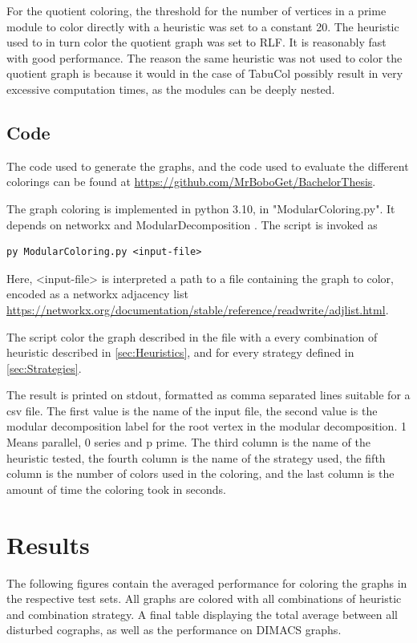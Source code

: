 \documentclass[a4paper]{article}
\begin{document}
For the quotient coloring, the threshold for the number of vertices in a prime
module to color directly with a heuristic was set to a constant 20. The
heuristic used to in turn color the quotient graph was set to RLF. It is
reasonably fast with good performance. The reason the same heuristic was not
used to color the quotient graph is because it would in the case of TabuCol
possibly result in very excessive computation times, as the modules can be
deeply nested.


\subsection{Code}

The code used to generate the graphs, and the code used to evaluate the
different colorings can be found at
\url{https://github.com/MrBoboGet/BachelorThesis}.

The graph coloring is implemented in python 3.10, in "ModularColoring.py". 
It depends on networkx \cite{Networkx} and ModularDecomposition \cite{Anna}.
The script is invoked as 
\begin{verbatim}
py ModularColoring.py <input-file> 
\end{verbatim}

Here, <input-file> is interpreted a path to a file containing the graph to color,
encoded as a networkx adjacency list \url{https://networkx.org/documentation/stable/reference/readwrite/adjlist.html}.

The script color the graph described in the file with a every combination of 
heuristic described in \autoref{sec:Heuristics}, and for every strategy 
defined in \autoref{sec:Strategies}.

The result is printed on stdout, formatted as comma separated lines suitable for
a csv file. The first value is the name of the input file, the second value is
the modular decomposition label for the root vertex in the modular
decomposition. 1 Means parallel, 0 series and p prime.  The third column is the
name of the heuristic tested, the fourth column is the name of the strategy
used, the fifth column is the number of colors used in the coloring, and the
last column is the amount of time the coloring took in seconds.

\section{Results}
\label{sec:Result}

The following figures contain the averaged performance for coloring the graphs in the
respective test sets. All graphs are colored with all combinations of heuristic
and combination strategy. A final table displaying the total average between
all disturbed cographs, as well as the performance on DIMACS graphs. 
\end{document}
